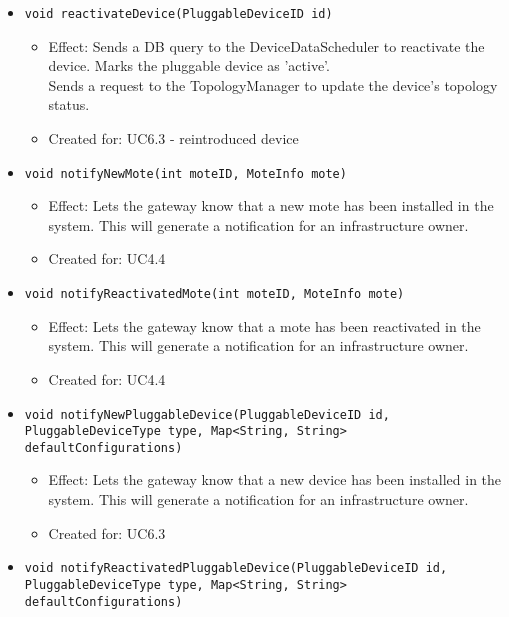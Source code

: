 {{{\begin{itemize}
\begin{itemize}
                \item \texttt{void reactivateDevice(PluggableDeviceID id)}
                    \begin{itemize}
                        \item Effect: Sends a DB query to the DeviceDataScheduler to reactivate the device. Marks the pluggable device as 'active'. \\
                              Sends a request to the TopologyManager to update the device's topology status.
                        \item Created for: UC6.3 - reintroduced device
                    \end{itemize}
                \item \texttt{void notifyNewMote(int moteID, MoteInfo mote)}
                    \begin{itemize}
                        \item Effect: Lets the gateway know that a new mote has been installed in the system.
                              This will generate a notification for an infrastructure owner.
                        \item Created for: UC4.4
                    \end{itemize}
                \item \texttt{void notifyReactivatedMote(int moteID, MoteInfo mote)}
                    \begin{itemize}
                        \item Effect: Lets the gateway know that a mote has been reactivated in the system.
                              This will generate a notification for an infrastructure owner.
                        \item Created for: UC4.4
                    \end{itemize}
                \item \texttt{void notifyNewPluggableDevice(PluggableDeviceID id, PluggableDeviceType type, Map<String, String> defaultConfigurations)}
                    \begin{itemize}
                        \item Effect: Lets the gateway know that a new device has been installed in the system.
                              This will generate a notification for an infrastructure owner.
                        \item Created for: UC6.3
                    \end{itemize}
                \item \texttt{void notifyReactivatedPluggableDevice(PluggableDeviceID id, PluggableDeviceType type, Map<String, String> defaultConfigurations)}

\end{itemize}
\end{itemize}}}}
